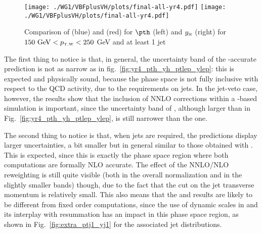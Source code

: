 \begin{figure}
  \centering
  \texttt{[image: ./WG1/VBFplusVH/plots/final-all-yr4.pdf]}
  \texttt{[image: ./WG1/VBFplusVH/plots/final-all-yr4.pdf]}
  \caption{Comparison of \HWJMINLOPS{} (blue) and \HWNNLOPS{} (red) for $\pth$ (left) and $y_{\scriptscriptstyle \mathrm{H}}$ (right) for $150\mbox{ GeV}<p_{\scriptscriptstyle \mathrm{T,W}}<250$ GeV and at least 1 jet}
  \label{fig:yr4_1j_w2_pth_yh}
\end{figure}
The first thing to notice is that, in general, the uncertainty band of
the \NNLOPS{}-accurate prediction is not as narrow as in
fig.~\ref{fig:yr4_pth_yh_ptlep_ylep}: this is expected and physically
sound, because the phase space is not fully inclusive with respect to
the QCD activity, due to the requirements on jets. In the jet-veto
case, however, the results show that the inclusion of NNLO corrections
within a \MINLO{}-based simulation is important, since the uncertainty
band of \HVNNLOPS{}, although larger than in
Fig.~\ref{fig:yr4_pth_yh_ptlep_ylep}, is still narrower than the
\HWJMINLO{} one.

The second thing to notice is that, when jets are required, the
\HVNNLOPS{} predictions display larger uncertainties, a bit smaller
but in general similar to those obtained with \HWJMINLO{}. This is
expected, since this is exactly the phase space region where both
computations are formally NLO accurate. The effect of the NNLO/NLO
reweighting is still quite visible (both in the overall normalization
and in the slightly smaller bands) though, due to the fact that the
cut on the jet transverse momentum is relatively small. This also
means that the \HWJMINLO{} and \HVNNLOPS{} results are likely to be
different from fixed order computations, since the use of dynamic
scales in \MINLO{} and its interplay with resummation has an impact in
this phase space region, as shown in Fig.~\ref{fig:extra_ptj1_yj1} for
the associated jet distributions.

